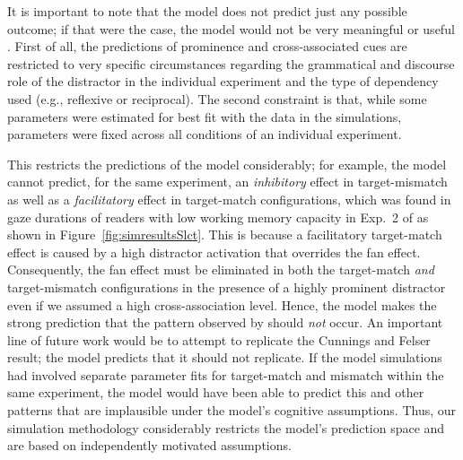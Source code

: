 \documentclass{cambridge7A}\usepackage[]{graphicx}\usepackage[]{color}
\newcommand{\revFE}[1]{#1}
\begin{document}
\revFE{
It is important to note that the model does not predict just any possible outcome; if that were the case, the model would not be very meaningful or useful \citep{rp}.
First of all, the predictions of prominence and cross-associated cues are restricted to very specific circumstances regarding the grammatical and discourse role of the distractor in the individual experiment and the type of dependency used (e.g., reflexive or reciprocal).
The second constraint is that, while some parameters were estimated for best fit with the data in the simulations, parameters were fixed across all conditions of an individual experiment.
}
This restricts the predictions of the model considerably; for example, the model cannot predict, for the same experiment, an \emph{inhibitory} effect in target-mismatch as well as a \emph{facilitatory} effect in target-match configurations, which was found in gaze durations of readers with low working memory capacity in Exp.~2 of \cite{CunningsFelser2013} as shown in Figure~\ref{fig:simresultsSlct}. 
This is because a facilitatory target-match effect is caused by a high distractor activation that overrides the fan effect. Consequently, the fan effect must be eliminated in both the target-match \textit{and} target-mismatch configurations in the presence of a highly prominent distractor even if we assumed a high cross-association level.
Hence, the model makes the strong prediction that the pattern observed by \cite{CunningsFelser2013} should \emph{not} occur. An important line of future work would be to attempt to replicate the Cunnings and Felser result; the model predicts that it should not replicate. If the model simulations had involved separate parameter fits for target-match and mismatch within the same experiment, the model would have been able to predict this and other patterns that are implausible under the model's cognitive assumptions.
\revFE{Thus, our simulation methodology  considerably restricts the model's prediction space and are based on independently motivated assumptions.}
\end{document}
